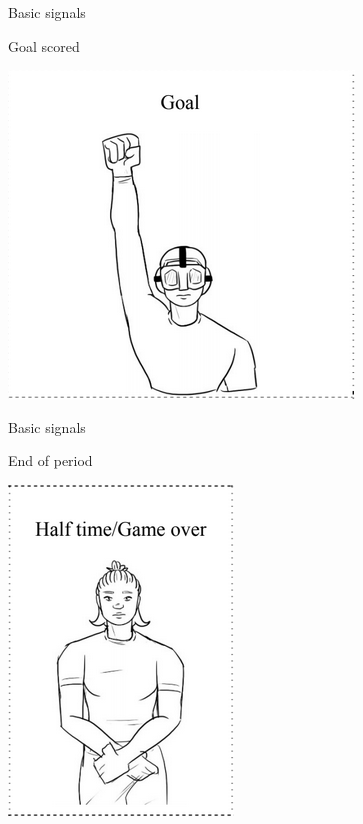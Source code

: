 \documentclass{beamer}
\begin{document}
	\begin{frame}{Basic signals}
		\begin{center}
			Goal scored

			\vspace{0.5cm}

			\includegraphics[scale=0.8]{goalScoredSignal}
		\end{center}
	\end{frame}

	\begin{frame}{Basic signals}
		\begin{center}
			End of period

			\vspace{0.5cm}

			\includegraphics[scale=0.8]{endOfPeriodSignal}
		\end{center}
	\end{frame}
\end{document}
